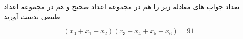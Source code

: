 \exercise
تعداد جواب های معادله زیر را هم در مجموعه اعداد صحیح و هم در مجموعه اعداد طبیعی بدست آورید.

$$(x_0 + x_1 + x_2)(x_3 + x_4 + x_5 + x_6) = 91$$
